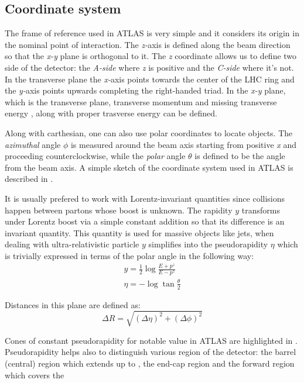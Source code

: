 \subsection{Coordinate system}
The frame of reference used in ATLAS is very simple and it considers its origin in the nominal point of interaction. The \emph{z-}axis is defined along the beam direction so that the \emph{x-y} plane is orthogonal to it. The \emph{z} coordinate allows us to define two side of the detector: the \emph{A-side} where \emph{z} is positive and the \emph{C-side} where it's not. In the transverse plane the \emph{x-}axis points towards the center of the LHC ring and the \emph{y-}axis points upwards completing the right-handed triad. In the \emph{x-y} plane, which is the transverse plane, transverse momentum \pt and missing transverse energy \met, along with proper trasverse energy \et can be defined.

Along with carthesian, one can also use polar coordinates to locate objects. The \emph{azimuthal} angle $\phi$ is measured around the beam axis starting from positive \emph{x} and proceeding counterclockwise, while the \emph{polar} angle $\theta$ is defined to be the angle from the beam axis. A simple sketch of the coordinate system used in ATLAS is described in \Fig{\ref{fig:coordinate}}.

It is usually prefered to work with Lorentz-invariant quantities since collisions happen between partons whose boost is unknown. The rapidity $y$ transforms under Lorentz boost via a simple constant addition so that its difference is an invariant quantity. This quantity is used for massive objects like jets, when dealing with ultra-relativistic particle $y$ simplifies into the pseudorapidity $\eta$ which is trivially expressed in terms of the polar angle in the following way:
\begin{gather}
	y=\frac{1}{2}\log{\frac{E+p^z}{E-p^z}}\\
	\eta=-\log{\tan{\frac{\theta}{2}}}
\end{gather}

Distances in this plane are defined as:
\begin{equation}
	\Delta R=\sqrt{\left(\Delta \eta \right)^2 + \left(\Delta \phi \right)^2}
\end{equation}

Cones of constant pseudorapidity for notable value in ATLAS are highlighted in \Fig{\ref{fig:pseudorapidita}}. Pseudorapidity helps also to distinguish various region of the detector: the barrel (central) region which extends up to , the  end-cap region  and the forward region which covers the 

